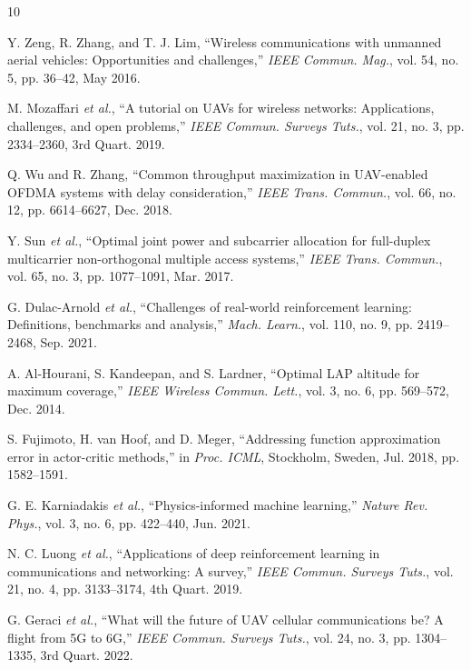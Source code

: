 \documentclass[journal]{IEEEtran}
\begin{document}

\begin{thebibliography}{10}

Y. Zeng, R. Zhang, and T. J. Lim, ``Wireless communications with unmanned aerial vehicles: Opportunities and challenges,'' \textit{IEEE Commun. Mag.}, vol. 54, no. 5, pp. 36--42, May 2016.

M. Mozaffari \textit{et al.}, ``A tutorial on UAVs for wireless networks: Applications, challenges, and open problems,'' \textit{IEEE Commun. Surveys Tuts.}, vol. 21, no. 3, pp. 2334--2360, 3rd Quart. 2019.

Q. Wu and R. Zhang, ``Common throughput maximization in UAV-enabled OFDMA systems with delay consideration,'' \textit{IEEE Trans. Commun.}, vol. 66, no. 12, pp. 6614--6627, Dec. 2018.

Y. Sun \textit{et al.}, ``Optimal joint power and subcarrier allocation for full-duplex multicarrier non-orthogonal multiple access systems,'' \textit{IEEE Trans. Commun.}, vol. 65, no. 3, pp. 1077--1091, Mar. 2017.

G. Dulac-Arnold \textit{et al.}, ``Challenges of real-world reinforcement learning: Definitions, benchmarks and analysis,'' \textit{Mach. Learn.}, vol. 110, no. 9, pp. 2419--2468, Sep. 2021.

A. Al-Hourani, S. Kandeepan, and S. Lardner, ``Optimal LAP altitude for maximum coverage,'' \textit{IEEE Wireless Commun. Lett.}, vol. 3, no. 6, pp. 569--572, Dec. 2014.

S. Fujimoto, H. van Hoof, and D. Meger, ``Addressing function approximation error in actor-critic methods,'' in \textit{Proc. ICML}, Stockholm, Sweden, Jul. 2018, pp. 1582--1591.

G. E. Karniadakis \textit{et al.}, ``Physics-informed machine learning,'' \textit{Nature Rev. Phys.}, vol. 3, no. 6, pp. 422--440, Jun. 2021.

N. C. Luong \textit{et al.}, ``Applications of deep reinforcement learning in communications and networking: A survey,'' \textit{IEEE Commun. Surveys Tuts.}, vol. 21, no. 4, pp. 3133--3174, 4th Quart. 2019.

G. Geraci \textit{et al.}, ``What will the future of UAV cellular communications be? A flight from 5G to 6G,'' \textit{IEEE Commun. Surveys Tuts.}, vol. 24, no. 3, pp. 1304--1335, 3rd Quart. 2022.

\end{thebibliography}
\end{document}
